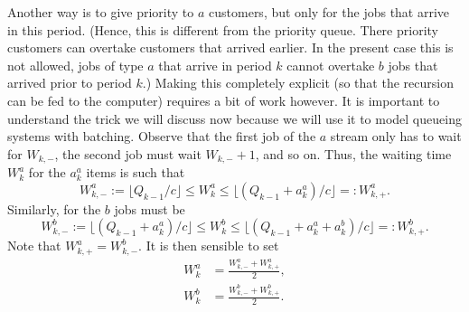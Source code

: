 \begin{exercise}
\begin{solution}
    Another way is to give priority to $a$ customers, but only for the
    jobs that arrive in this period. (Hence, this is different from
    the priority queue. There priority customers can overtake
    customers that arrived earlier. In the present case this is not
    allowed, jobs of type $a$ that arrive in period $k$ cannot
    overtake $b$ jobs that arrived prior to period $k$.)  Making this
    completely explicit (so that the recursion can be fed to the
    computer) requires a bit of work however.  It is important to
    understand the trick we will discuss now because we will use it to
    model queueing systems with batching. Observe that the first job
    of the $a$ stream only has to wait for $W_{k,-}$, the second job
    must wait $W_{k,-}+1$, and so on. Thus, the waiting time $W_{k}^a$
    for the $a_k^a$ items is such that
    \begin{equation*}
W_{k,-}^a:= \lfloor Q_{k-1}/c \rfloor \leq  W_{k}^a \leq \lfloor (Q_{k-1}+a_k^a)/c \rfloor =: W_{k,+}^a.
    \end{equation*}
    Similarly, for the $b$ jobs must be
    \begin{equation*}
W_{k,-}^b := \lfloor (Q_{k-1}+a_k^a)/c \rfloor \leq  W_{k}^b \leq \lfloor (Q_{k-1}+a_k^a+a_k^b)/c \rfloor =: W_{k,+}^b.
    \end{equation*}
Note that $W_{k,+}^a = W_{k,-}^b$. 
It is then sensible to set 
\begin{align*}
  W_{k}^a &= \frac{W_{k,-}^a + W_{k,+}^a}2, \\
  W_{k}^b &= \frac{W_{k,-}^b + W_{k,+}^b}2.
\end{align*}

  \end{solution}
\end{exercise}



